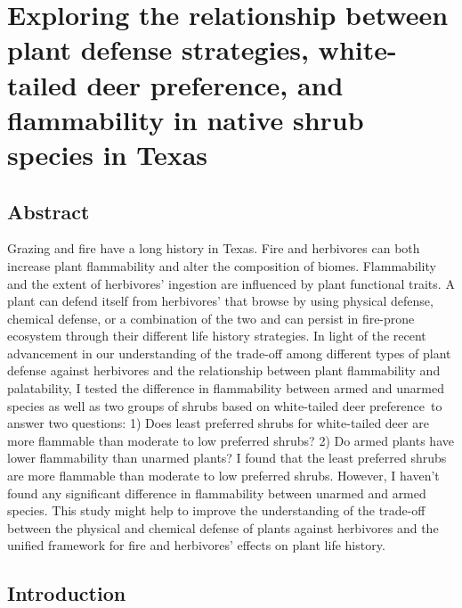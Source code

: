 \documentclass[12pt]{report}
\begin{document}
\chapter{Exploring the relationship between plant defense strategies, white-tailed deer preference, and flammability in native shrub species in Texas} 

\section{Abstract}

Grazing and fire have a long history in Texas. Fire and herbivores can both increase plant flammability and alter the composition of biomes. Flammability and the extent of herbivores' ingestion are influenced by plant functional traits. A plant can defend itself from herbivores' that browse by using physical defense, chemical defense, or a combination of the two and can persist in fire-prone ecosystem through their different life history strategies. In light of the recent advancement in our understanding of the trade-off among different types of plant defense against herbivores and the relationship between plant flammability and palatability, I tested the difference in flammability between armed and unarmed species as well as two groups of shrubs based on white-tailed deer preference to answer two questions: 1) Does least preferred shrubs for white-tailed deer are more flammable than moderate to low preferred shrubs? 2) Do armed plants have lower flammability than unarmed plants? I found that the least preferred shrubs are more flammable than moderate to low preferred shrubs. However, I haven't found any significant difference in flammability between
unarmed and armed species. This study might help to improve the understanding of the trade-off between the physical and chemical defense of plants against herbivores and the unified framework for fire and herbivores' effects on plant life history. 


\section{Introduction}
\end{document}
